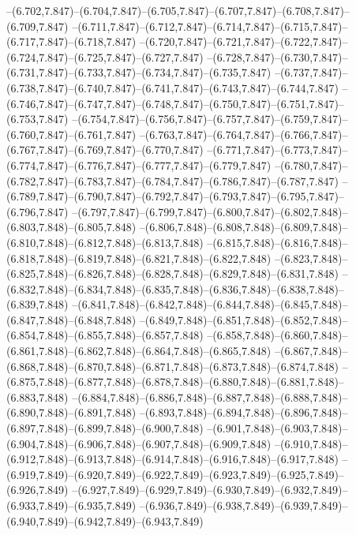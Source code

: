   --(6.702,7.847)--(6.704,7.847)--(6.705,7.847)--(6.707,7.847)--(6.708,7.847)--(6.709,7.847)%
  --(6.711,7.847)--(6.712,7.847)--(6.714,7.847)--(6.715,7.847)--(6.717,7.847)--(6.718,7.847)%
  --(6.720,7.847)--(6.721,7.847)--(6.722,7.847)--(6.724,7.847)--(6.725,7.847)--(6.727,7.847)%
  --(6.728,7.847)--(6.730,7.847)--(6.731,7.847)--(6.733,7.847)--(6.734,7.847)--(6.735,7.847)%
  --(6.737,7.847)--(6.738,7.847)--(6.740,7.847)--(6.741,7.847)--(6.743,7.847)--(6.744,7.847)%
  --(6.746,7.847)--(6.747,7.847)--(6.748,7.847)--(6.750,7.847)--(6.751,7.847)--(6.753,7.847)%
  --(6.754,7.847)--(6.756,7.847)--(6.757,7.847)--(6.759,7.847)--(6.760,7.847)--(6.761,7.847)%
  --(6.763,7.847)--(6.764,7.847)--(6.766,7.847)--(6.767,7.847)--(6.769,7.847)--(6.770,7.847)%
  --(6.771,7.847)--(6.773,7.847)--(6.774,7.847)--(6.776,7.847)--(6.777,7.847)--(6.779,7.847)%
  --(6.780,7.847)--(6.782,7.847)--(6.783,7.847)--(6.784,7.847)--(6.786,7.847)--(6.787,7.847)%
  --(6.789,7.847)--(6.790,7.847)--(6.792,7.847)--(6.793,7.847)--(6.795,7.847)--(6.796,7.847)%
  --(6.797,7.847)--(6.799,7.847)--(6.800,7.847)--(6.802,7.848)--(6.803,7.848)--(6.805,7.848)%
  --(6.806,7.848)--(6.808,7.848)--(6.809,7.848)--(6.810,7.848)--(6.812,7.848)--(6.813,7.848)%
  --(6.815,7.848)--(6.816,7.848)--(6.818,7.848)--(6.819,7.848)--(6.821,7.848)--(6.822,7.848)%
  --(6.823,7.848)--(6.825,7.848)--(6.826,7.848)--(6.828,7.848)--(6.829,7.848)--(6.831,7.848)%
  --(6.832,7.848)--(6.834,7.848)--(6.835,7.848)--(6.836,7.848)--(6.838,7.848)--(6.839,7.848)%
  --(6.841,7.848)--(6.842,7.848)--(6.844,7.848)--(6.845,7.848)--(6.847,7.848)--(6.848,7.848)%
  --(6.849,7.848)--(6.851,7.848)--(6.852,7.848)--(6.854,7.848)--(6.855,7.848)--(6.857,7.848)%
  --(6.858,7.848)--(6.860,7.848)--(6.861,7.848)--(6.862,7.848)--(6.864,7.848)--(6.865,7.848)%
  --(6.867,7.848)--(6.868,7.848)--(6.870,7.848)--(6.871,7.848)--(6.873,7.848)--(6.874,7.848)%
  --(6.875,7.848)--(6.877,7.848)--(6.878,7.848)--(6.880,7.848)--(6.881,7.848)--(6.883,7.848)%
  --(6.884,7.848)--(6.886,7.848)--(6.887,7.848)--(6.888,7.848)--(6.890,7.848)--(6.891,7.848)%
  --(6.893,7.848)--(6.894,7.848)--(6.896,7.848)--(6.897,7.848)--(6.899,7.848)--(6.900,7.848)%
  --(6.901,7.848)--(6.903,7.848)--(6.904,7.848)--(6.906,7.848)--(6.907,7.848)--(6.909,7.848)%
  --(6.910,7.848)--(6.912,7.848)--(6.913,7.848)--(6.914,7.848)--(6.916,7.848)--(6.917,7.848)%
  --(6.919,7.849)--(6.920,7.849)--(6.922,7.849)--(6.923,7.849)--(6.925,7.849)--(6.926,7.849)%
  --(6.927,7.849)--(6.929,7.849)--(6.930,7.849)--(6.932,7.849)--(6.933,7.849)--(6.935,7.849)%
  --(6.936,7.849)--(6.938,7.849)--(6.939,7.849)--(6.940,7.849)--(6.942,7.849)--(6.943,7.849)%

